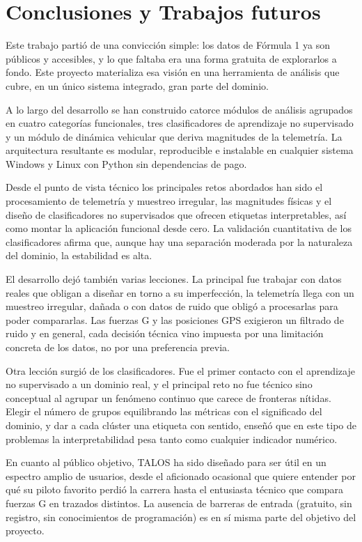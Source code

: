 \documentclass[12pt,a4paper,twoside,openright]{book}
\begin{document}
\chapter{Conclusiones y Trabajos futuros}
Este trabajo partió de una convicción simple: los datos de Fórmula 1 ya son públicos y accesibles, y lo que faltaba era una forma gratuita de explorarlos a fondo. Este proyecto materializa esa visión en una herramienta de análisis que cubre, en un único sistema integrado, gran parte del dominio.

\noindent A lo largo del desarrollo se han construido catorce módulos de análisis agrupados en cuatro categorías funcionales, tres clasificadores de aprendizaje no supervisado y un módulo de dinámica vehicular que deriva magnitudes de la telemetría. La arquitectura resultante es modular, reproducible e instalable en cualquier sistema Windows y Linux con Python sin dependencias de pago.

\noindent Desde el punto de vista técnico los principales retos abordados han sido el procesamiento de telemetría y muestreo irregular, las magnitudes físicas y el diseño de clasificadores no supervisados que ofrecen etiquetas interpretables, así como montar la aplicación funcional desde cero.
La validación cuantitativa de los clasificadores afirma que, aunque hay una separación moderada por la naturaleza del dominio, la estabilidad es alta.

\noindent El desarrollo dejó también varias lecciones. La principal fue trabajar con datos reales que obligan a diseñar en torno a su imperfección, la telemetría llega con un muestreo irregular, dañada o con datos de ruido que obligó a procesarlas para poder compararlas. Las fuerzas G y las posiciones GPS exigieron un filtrado de ruido y en general, cada decisión técnica vino impuesta por una limitación concreta de los datos, no por una preferencia previa.

\noindent Otra lección surgió de los clasificadores. Fue el primer contacto con el aprendizaje no supervisado a un dominio real, y el principal reto no fue técnico sino conceptual al agrupar un fenómeno continuo que carece de fronteras nítidas. Elegir el número de grupos  equilibrando las métricas con el significado del dominio, y dar a cada clúster una etiqueta con sentido, enseñó que en este tipo de problemas la interpretabilidad pesa tanto como cualquier indicador numérico.

\noindent En cuanto al público objetivo, TALOS ha sido diseñado para ser útil en un espectro amplio de usuarios, desde el aficionado ocasional que quiere entender por qué su piloto favorito perdió la carrera hasta el entusiasta técnico que compara fuerzas G en trazados distintos. La ausencia de barreras de entrada (gratuito, sin registro, sin conocimientos de programación)
es en sí misma parte del objetivo del proyecto.
\end{document}

